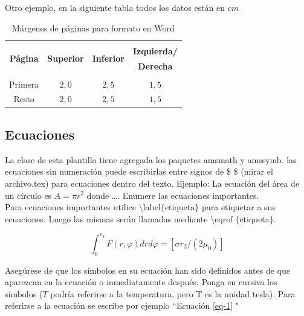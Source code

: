 \documentclass[10.5 pt, twocolumn]{article}
\begin{document}
Otro ejemplo, en la siguiente tabla todos los datos están en $cm$
\begin{table}[!htb]
    \footnotesize %
    \begin{center}
        \caption{Márgenes de páginas para formato en Word \\[-0.3cm]} %
        \begin{tabular}{c c c c}
            \hline\\[-0.3cm] 
             \multirow{2}{*}{{\bf Página}} &  \multirow{2}{*}{\bf Superior} &  \multirow{2}{*}{\bf Inferior} & \bf Izquierda/ \\  [-1pt]
             & & &\bf Derecha \\ [-1.5pt]
             \hline
             \\ [-0.3cm]
             Primera & $2,0$ & $2,5$ & $1,5$ \\ [-1pt]
             Resto & $2,0$ & $2,5$ & $1,5$ \\ [-1.5pt]
             \hline
        \end{tabular} 
        \label{fig2-medidas}
    \end{center}
\end{table}

\subsection{Ecuaciones}
La clase de esta plantilla tiene agregada los paquetes amsmath y amssymb. las ecuaciones sin numeración puede escribirlas entre signos de \$ \$ (mirar el archivo.tex) para ecuaciones dentro del texto. Ejemplo: La ecuación del área de un círculo es $A = \pi r^2$ donde \ldots. Enumere las ecuaciones importantes. \\

Para ecuaciones importantes utilice $\setminus$label$\lbrace \text{etiqueta}\rbrace$ para etiquetar a sus ecuaciones.  Luego las mismas serán llamadas mediante $\setminus$eqref $\lbrace$etiqueta$\rbrace$. 

\begin{equation}
    \int _0  ^{r_2} F(r,\varphi ) dr d\varphi=[\sigma r_2 /(2 \mu _0)]
    \label{eq-1}
\end{equation}

Asegúrese de que los símbolos en su ecuación han sido definidos antes de que aparezcan en la ecuación o inmediatamente después. Ponga en cursiva los símbolos ($T$ podría referirse a la temperatura, pero T es la unidad tesla). Para referirse a la ecuación se escribe por ejemplo ``Ecuación \eqref{eq-1} "
\end{document}
